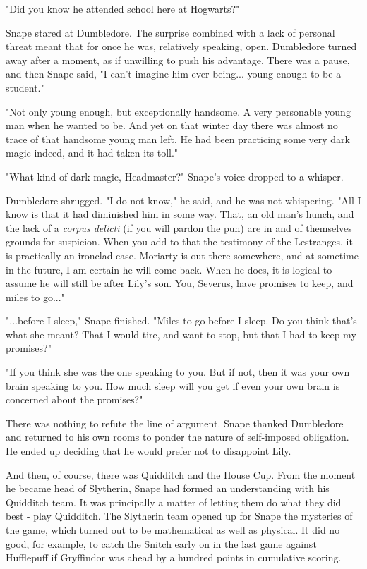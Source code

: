 \documentclass[a4paper,11pt]{article}
\begin{document}
"Did you know he attended school here at Hogwarts?"

Snape stared at Dumbledore. The surprise combined with a lack of personal threat meant that for once he was, relatively speaking, open. Dumbledore turned away after a moment, as if unwilling to push his advantage. There was a pause, and then Snape said, "I can't imagine him ever being... young enough to be a student."

"Not only young enough, but exceptionally handsome. A very personable young man when he wanted to be. And yet on that winter day there was almost no trace of that handsome young man left. He had been practicing some very dark magic indeed, and it had taken its toll."

"What kind of dark magic, Headmaster?" Snape's voice dropped to a whisper.

Dumbledore shrugged. "I do not know," he said, and he was not whispering. "All I know is that it had diminished him in some way. That, an old man's hunch, and the lack of a \emph{corpus delicti} (if you will pardon the pun) are in and of themselves grounds for suspicion. When you add to that the testimony of the Lestranges, it is practically an ironclad case. Moriarty is out there somewhere, and at sometime in the future, I am certain he will come back. When he does, it is logical to assume he will still be after Lily's son. You, Severus, have promises to keep, and miles to go..."

"...before I sleep," Snape finished. "Miles to go before I sleep. Do you think that's what she meant? That I would tire, and want to stop, but that I had to keep my promises?"

"If you think she was the one speaking to you. But if not, then it was your own brain speaking to you. How much sleep will you get if even your own brain is concerned about the promises?"

There was nothing to refute the line of argument. Snape thanked Dumbledore and returned to his own rooms to ponder the nature of self-imposed obligation. He ended up deciding that he would prefer not to disappoint Lily.

And then, of course, there was Quidditch and the House Cup. From the moment he became head of Slytherin, Snape had formed an understanding with his Quidditch team. It was principally a matter of letting them do what they did best - play Quidditch. The Slytherin team opened up for Snape the mysteries of the game, which turned out to be mathematical as well as physical. It did no good, for example, to catch the Snitch early on in the last game against Hufflepuff if Gryffindor was ahead by a hundred points in cumulative scoring.
\end{document}
